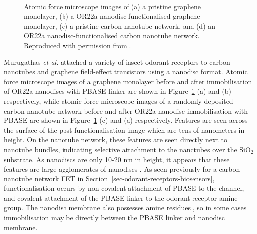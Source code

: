 \documentclass[
  a4paper,
]{scrbook}
\begin{document}
\begin{figure}
\begin{minipage}[t]{0.45\linewidth}
\end{minipage}%
%
\begin{minipage}[t]{0.01\linewidth}

{\centering 

~

}

\end{minipage}%

\caption{\label{fig-functionalisation-AFM-literature}Atomic force
microscope images of (a) a pristine graphene monolayer, (b) a OR22a
nanodisc-functionalised graphene monolayer, (c) a pristine carbon
nanotube network, and (d) an OR22a nanodisc-functionalised carbon
nanotube network. Reproduced with permission from
\autocite{Murugathas2019a,Murugathas2020}.}

\end{figure}

Murugathas \emph{et al.} attached a variety of insect odorant receptors
to carbon nanotubes and graphene field-effect transistors using a
nanodisc format. Atomic force microscope images of a graphene monolayer
before and after immobilisation of OR22a nanodiscs with PBASE linker are
shown in Figure~\ref{fig-functionalisation-AFM-literature} (a) and (b)
respectively, while atomic force microscope images of a randomly
deposited carbon nanotube network before and after OR22a nanodisc
immobilisation with PBASE are shown in
Figure~\ref{fig-functionalisation-AFM-literature} (c) and (d)
respectively. Features are seen across the surface of the
post-functionalisation image which are tens of nanometers in height. On
the nanotube network, these features are seen directly next to nanotube
bundles, indicating selective attachment to the nanotubes over the
SiO\(_2\) substrate. As nanodiscs are only 10-20 nm in height, it
appears that these features are large agglomerates of nanodiscs
\autocite{Nath2007,Bayburt2010,Murugathas2019a,Murugathas2020}. As seen
previously for a carbon nanotube network FET in
Section~\ref{sec-odorant-receptors-biosensors}, functionalisation occurs
by non-covalent attachment of PBASE to the channel, and covalent
attachment of the PBASE linker to the odorant receptor amine group. The
nanodisc membrane also possesses amine residues \autocite{Bayburt2010},
so in some cases immobilisation may be directly between the PBASE linker
and nanodisc membrane.
\end{document}
